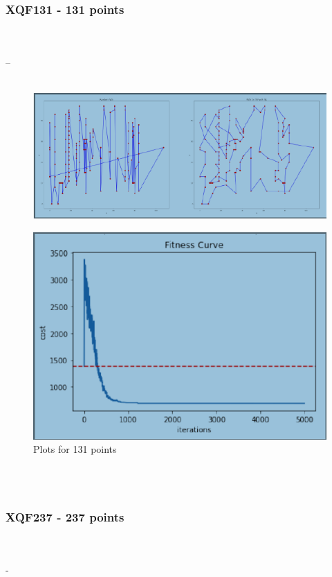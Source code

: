 \documentclass[conference]{IEEEtran}
\begin{document}
\subsubsection{XQF131 - 131 points}
\\
\\
--
\\
\\
\begin{figure}[htbp]
\centerline{\includegraphics[scale=0.8]{gya.png}}

\label{fig}
\end{figure}
\begin{figure}[htbp]
\centerline{\includegraphics[scale=0.8]{plot1.png}}
\caption{Plots for 131 points}
\label{}
\end{figure}
\\
\\
\subsubsection{XQF237 - 237 points}
\\
\\
-
\\
\\
\begin{figure}[htbp]
\label{fig}
\end{figure}
\\
\\
\begin{figure}[htbp]
\caption{}
\label{fig}
\end{figure}
\end{document}
